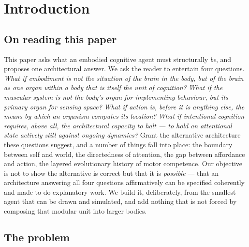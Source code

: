 \documentclass{article}
\begin{document}
\section{Introduction}\label{sec:intro}

\subsection*{On reading this paper}

This paper asks what an embodied cognitive agent must structurally
\emph{be}, and proposes one architectural answer.  We ask the reader to
entertain four questions.  \emph{What if embodiment is not the situation
of the brain in the body, but of the brain as one organ within a body
that is itself the unit of cognition?}  \emph{What if the muscular system
is not the body's organ for implementing behaviour, but its primary organ
for sensing space?}  \emph{What if action is, before it is anything else,
the means by which an organism computes its location?}  \emph{What if
intentional cognition requires, above all, the architectural capacity to
\emph{halt} --- to hold an attentional state actively still against
ongoing dynamics?}  Grant the alternative architecture these questions
suggest, and a number of things fall into place: the boundary between
self and world, the directedness of attention, the gap between affordance
and action, the layered evolutionary history of motor competence.  Our
objective is not to show the alternative is correct but that it is
\emph{possible} --- that an architecture answering all four questions
affirmatively can be specified coherently and made to do explanatory
work.  We build it, deliberately, from the smallest agent that can be
drawn and simulated, and add nothing that is not forced by composing that
modular unit into larger bodies.

\subsection*{The problem}
\end{document}
